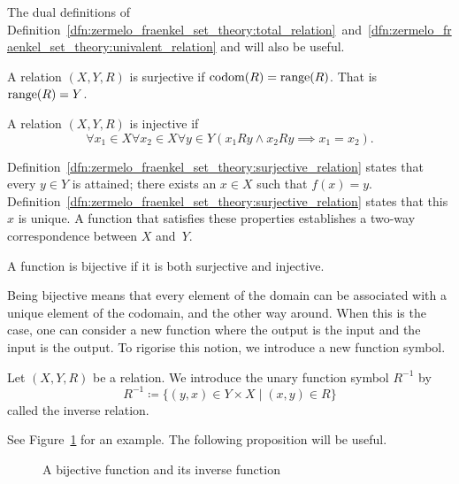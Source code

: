 \documentclass[../main.tex]{subfiles}
\begin{document}
The dual definitions of Definition~\ref{dfn:zermelo_fraenkel_set_theory:total_relation}~and~\ref{dfn:zermelo_fraenkel_set_theory:univalent_relation} and will also be useful.
\begin{definition}\label{dfn:zermelo_fraenkel_set_theory:surjective_relation}
    A relation $(X,Y,R)$ is surjective if $\operatorname{codom}(R)=\operatorname{range}(R)$. That is $\operatorname{range}(R)=Y$.
\end{definition}
\begin{definition}
    A relation $(X,Y,R)$ is injective if
    \begin{equation*}
        \forall x_1\in X\forall x_2\in X\forall y\in Y(x_1Ry\land x_2Ry\implies x_1=x_2).
    \end{equation*}
\end{definition}
Definition~\ref{dfn:zermelo_fraenkel_set_theory:surjective_relation} states that every $y\in Y$ is attained; there exists an $x\in X$ such that $f(x)=y$. Definition~\ref{dfn:zermelo_fraenkel_set_theory:surjective_relation} states that this $x$ is unique. A function that satisfies these properties establishes a two-way correspondence between $X$ and~$Y$.
\begin{definition}\label{dfn:zermelo_fraenkel_set_theory:bijective_function}
    A function is bijective if it is both surjective and injective.
\end{definition}
Being bijective means that every element of the domain can be associated with a unique element of the codomain, and the other way around. When this is the case, one can consider a new function where the output is the input and the input is the output. To rigorise this notion, we introduce a new function symbol.
\begin{definition}\label{dfn:zermelo_fraenkel_set_theory:inverse_relation}
    Let $(X,Y,R)$ be a relation. We introduce the unary function symbol $R^{-1}$ by
    \begin{equation*}
        R^{-1}\coloneq\{(y,x)\in Y\times X\mid (x,y)\in R\}
    \end{equation*}
    called the inverse relation.
\end{definition}
See Figure~\ref{fig:zermelo_fraenkel_set_theory:bijective_function_and_inverse} for an example. The following proposition will be useful.
\begin{figure}[!htbp]
    \centering
    
    \caption{A bijective function and its inverse function}
    \label{fig:zermelo_fraenkel_set_theory:bijective_function_and_inverse}
\end{figure}
\end{document}

